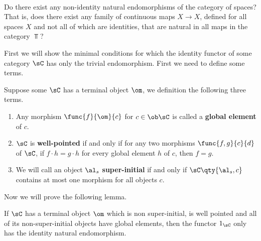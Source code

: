 \documentclass[main.tex]{subfiles}
\begin{document}
\paragraph{}
\begin{exercise}
	
Do there exist any non-identity natural endomorphisms of the category of spaces? That is, does there exist any family of continuous maps $X\rightarrow X$, defined for all spaces $X$ and not all of which are identities, that are natural in all maps in the category $\Top$?
	
	
\end{exercise}


First we will show the minimal conditions for which the identity functor of some category $\sC$ has only the trivial endomorphism. First we need to define some terms.

\begin{definition}
	
	Suppose some $\sC$ has a terminal object $\om$, we definition the following three terms.
	\begin{enumerate}
		\item Any morphism $\func{f}{\om}{c}$ for $c \in \ob \sC$ is
			called a {\bf global element} of $c.$
		\item $\sC$ is {\bf well-pointed} if and only if for any two
			morphisms 
		$\func{f,g}{c}{d}$ of $\sC$, if $f \cdot h = g \cdot h$ for
		every 
		global element $h$ of $c$, then $f = g.$
		\item We will call an object $\al_{s}$ {\bf super-initial} if
			and only 
		if $\sC\qty{\al_{s},c}$ contains at most one morphism for all
		objects 
		$c.$
	\end{enumerate}

\end{definition}	

Now we will prove the following lemma.
\begin{lemma}
	If $\sC$ has a terminal object $\om$ which is non super-initial, is well 
	pointed and all of its non-super-initial objects have global elements, then 
	the functor $1_{\sC}$ only has the identity natural endomorphism.
\end{lemma}
\end{document}
